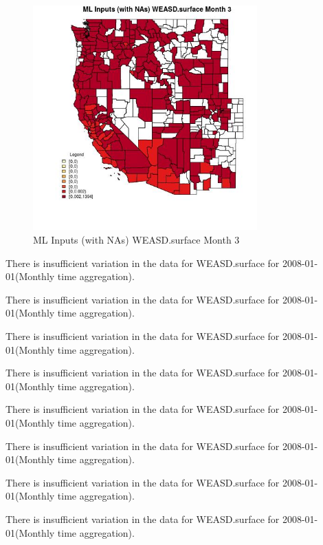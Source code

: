 \begin{figure} 
\centering  
\includegraphics[width=0.77\textwidth]{Code_Outputs/Report_ML_input_PM25_Step4_part_f_de_duplicated_aveswNAs_CountyWEASDsurfacemedianMonth3.jpg} 
\caption{\label{fig:Report_ML_input_PM25_Step4_part_f_de_duplicated_aveswNAsCountyWEASDsurfacemedianMonth3}ML Inputs (with NAs) WEASD.surface Month 3} 
\end{figure} 
 

There is insufficient variation in the data for WEASD.surface for 2008-01-01(Monthly time aggregation). 
 

There is insufficient variation in the data for WEASD.surface for 2008-01-01(Monthly time aggregation). 
 

There is insufficient variation in the data for WEASD.surface for 2008-01-01(Monthly time aggregation). 
 

There is insufficient variation in the data for WEASD.surface for 2008-01-01(Monthly time aggregation). 
 

There is insufficient variation in the data for WEASD.surface for 2008-01-01(Monthly time aggregation). 
 

There is insufficient variation in the data for WEASD.surface for 2008-01-01(Monthly time aggregation). 
 

There is insufficient variation in the data for WEASD.surface for 2008-01-01(Monthly time aggregation). 
 

There is insufficient variation in the data for WEASD.surface for 2008-01-01(Monthly time aggregation). 
 


